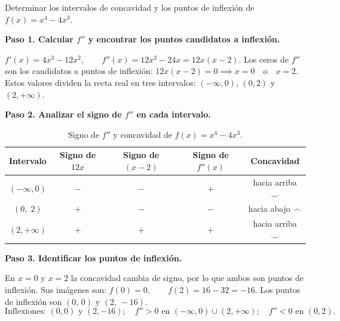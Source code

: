 \begin{example}[Concavidad e inflexiones de $f(x)=x^4-4x^3$]
Determinar los intervalos de concavidad y los puntos de inflexión de
$f(x)=x^4-4x^3$.
\begin{myproof}
\textbf{Paso 1. Calcular $f''$ y encontrar los puntos candidatos a
inflexión.}


\(
f'(x)  = 4x^3-12x^2, \qquad
f''(x) = 12x^2-24x  = 12x(x-2).
\)
Los ceros de $f''$ son los candidatos a puntos de inflexión: \(
12x(x-2)=0 \implies x=0 \quad\text{o}\quad x=2.
\)
Estos valores dividen la recta real en tres intervalos:
$(-\infty,0)$, $(0,2)$ y $(2,+\infty)$.

\textbf{Paso 2. Analizar el signo de $f''$ en cada intervalo.}

\begin{table}[H]
\centering
\begin{tabular}{c c c c c}
\toprule
Intervalo & Signo de $12x$ & Signo de $(x-2)$ & Signo de $f''(x)$
& Concavidad \\
\midrule
$(-\infty,0)$ & $-$ & $-$ & $+$ & hacia arriba $\smile$ \\
$(0,\;2)$     & $+$ & $-$ & $-$ & hacia abajo  $\frown$ \\
$(2,+\infty)$ & $+$ & $+$ & $+$ & hacia arriba $\smile$ \\
\bottomrule
\end{tabular}
\caption{Signo de $f''$ y concavidad de $f(x)=x^4-4x^3$.}
\end{table}

\textbf{Paso 3. Identificar los puntos de inflexión.}

En $x=0$ y $x=2$ la concavidad cambia de signo, por lo que ambos son
puntos de inflexión. Sus imágenes son: \(
f(0)=0, \qquad f(2)=16-32=-16.
\) Los puntos de inflexión son $(0,\,0)$ y $(2,\,-16)$.
\[
\boxed{\text{Inflexiones: }(0,0)\text{ y }(2,-16);\quad f''>0\text{ en }(-\infty,0)\cup(2,+\infty);\quad f''<0\text{ en }(0,2).}
\]

\begin{figure}[H]
\centering
\begin{tikzpicture}[>=stealth, xscale=2.5, yscale=0.26]


\end{tikzpicture}
\end{figure}
\end{myproof}
\end{example}
